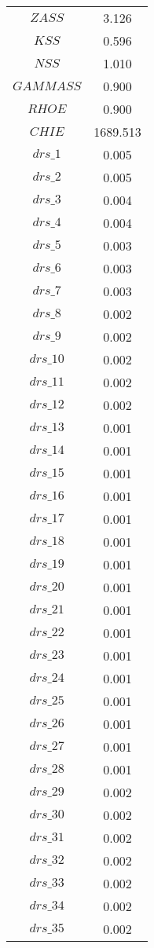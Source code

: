 \begin{center}
\begin{longtable}{cc}
$ZASS$ 	 & 	 3.126 \\
$KSS$ 	 & 	 0.596 \\
$NSS$ 	 & 	 1.010 \\
$GAMMASS$ 	 & 	 0.900 \\
$RHOE$ 	 & 	 0.900 \\
$CHIE$ 	 & 	 1689.513 \\
$drs\_1$ 	 & 	 0.005 \\
$drs\_2$ 	 & 	 0.005 \\
$drs\_3$ 	 & 	 0.004 \\
$drs\_4$ 	 & 	 0.004 \\
$drs\_5$ 	 & 	 0.003 \\
$drs\_6$ 	 & 	 0.003 \\
$drs\_7$ 	 & 	 0.003 \\
$drs\_8$ 	 & 	 0.002 \\
$drs\_9$ 	 & 	 0.002 \\
$drs\_10$ 	 & 	 0.002 \\
$drs\_11$ 	 & 	 0.002 \\
$drs\_12$ 	 & 	 0.002 \\
$drs\_13$ 	 & 	 0.001 \\
$drs\_14$ 	 & 	 0.001 \\
$drs\_15$ 	 & 	 0.001 \\
$drs\_16$ 	 & 	 0.001 \\
$drs\_17$ 	 & 	 0.001 \\
$drs\_18$ 	 & 	 0.001 \\
$drs\_19$ 	 & 	 0.001 \\
$drs\_20$ 	 & 	 0.001 \\
$drs\_21$ 	 & 	 0.001 \\
$drs\_22$ 	 & 	 0.001 \\
$drs\_23$ 	 & 	 0.001 \\
$drs\_24$ 	 & 	 0.001 \\
$drs\_25$ 	 & 	 0.001 \\
$drs\_26$ 	 & 	 0.001 \\
$drs\_27$ 	 & 	 0.001 \\
$drs\_28$ 	 & 	 0.001 \\
$drs\_29$ 	 & 	 0.002 \\
$drs\_30$ 	 & 	 0.002 \\
$drs\_31$ 	 & 	 0.002 \\
$drs\_32$ 	 & 	 0.002 \\
$drs\_33$ 	 & 	 0.002 \\
$drs\_34$ 	 & 	 0.002 \\
$drs\_35$ 	 & 	 0.002 \\

\end{longtable}
\end{center}
